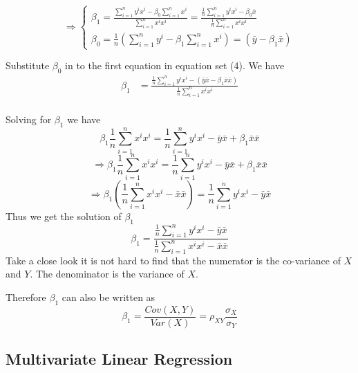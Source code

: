 \documentclass[12pt, oneside]{article}
\begin{document}
\begin{equation}
\Rightarrow
\begin{cases}
{\beta_1}=\frac{\sum\limits_{i=1}^{n}y^{i}x^{i}-{\beta_0}\sum\limits_{i=1}^{n}x^{i}}{\sum\limits_{i=1}^{n}x^{i}x^{i}}=\frac{\frac{1}{n}\sum\limits_{i=1}^{n}y^{i}x^{i}-{\beta_0}\bar{x}}{\frac{1}{n}\sum\limits_{i=1}^{n}x^{i}x^{i}}\\
{\beta_0}=\frac{1}{n}(\sum\limits_{i=1}^{n}y^{i}-{\beta_1}\sum\limits_{i=1}^{n} x^{i})=(\bar{y}-\beta_1\bar{x})
\end{cases}
\end{equation}

Substitute $\beta_0$ in to the first equation in equation set (4). We have 
\begin{align*}
{\beta_1}&=\frac{\frac{1}{n}\sum\limits_{i=1}^{n}y^{i}x^{i}-(\bar{y}\bar{x}-\beta_1\bar{x}\bar{x})}{\frac{1}{n}\sum\limits_{i=1}^{n}x^{i}x^{i}}\\
\end{align*}

Solving for $\beta_1$ we have
\begin{equation*}
\beta_1{\frac{1}{n}\sum\limits_{i=1}^{n}x^{i}x^{i}}=\frac{1}{n}\sum\limits_{i=1}^{n}y^{i}x^{i}-\bar{y}\bar{x}+\beta_1\bar{x}\bar{x}
\end{equation*}
\begin{equation*}
\Rightarrow
\beta_1{\frac{1}{n}\sum\limits_{i=1}^{n}x^{i}x^{i}}=\frac{1}{n}\sum\limits_{i=1}^{n}y^{i}x^{i}-\bar{y}\bar{x}+\beta_1\bar{x}\bar{x}
\end{equation*}
\begin{equation*}
\Rightarrow
\beta_1({\frac{1}{n}\sum\limits_{i=1}^{n}x^{i}x^{i}}-\bar{x}\bar{x})=\frac{1}{n}\sum\limits_{i=1}^{n}y^{i}x^{i}-\bar{y}\bar{x}
\end{equation*}
Thus we get the solution of $\beta_1$
\begin{equation}
\beta_1=\frac{\frac{1}{n}\sum\limits_{i=1}^{n}y^{i}x^{i}-\bar{y}\bar{x}}{{\frac{1}{n}\sum\limits_{i=1}^{n}x^{i}x^{i}}-\bar{x}\bar{x}}
\end{equation}
Take a close look it is not hard to find that the numerator is the co-variance of $X$ and $Y$. The denominator is the variance of $X$.

Therefore $\beta_1$ can also be written as 
\begin{equation}
\beta_1=\frac{Cov(X,Y)}{Var(X)}=\rho_{XY}\frac{\sigma_X}{\sigma_Y}
\end{equation}

\subsection{Multivariate Linear Regression}
\end{document}
